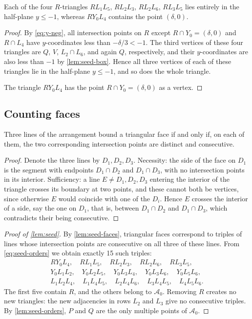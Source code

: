 \begin{lemma}\label{lem:r-triangles-below}
Each of the four $R$-triangles $RL_1L_5$, $RL_2L_3$, $RL_2L_6$, $RL_3L_5$ lies entirely in the half-plane $y\le-1$, whereas $RY_0L_4$ contains the point $(\delta,0)$.
\end{lemma}

\begin{proof}
By \eqref{eq:y-neg}, all intersection points on $R$ except $R\cap Y_0=(\delta,0)$ and $R\cap L_4$ have $y$-coordinates less than $-\delta/3<-1$.
The third vertices of these four triangles are $Q$, $V$,
$L_2\cap L_6$, and again $Q$, respectively, and their $y$-coordinates are also less than $-1$ by \cref{lem:seed-box}.
Hence all three vertices of each of these triangles lie in the half-plane $y\le-1$, and so does the
whole triangle.

The triangle $RY_0L_4$ has the point $R\cap Y_0=(\delta,0)$ as a vertex.
\end{proof}

\subsection{Counting faces}\label{app:seed-faces}

\begin{lemma}\label{lem:seed-faces}
Three lines of the arrangement bound a triangular face if and
only if, on each of them, the two corresponding intersection points
are distinct and consecutive.
\end{lemma}

\begin{proof}
Denote the three lines by $D_1,D_2,D_3$.
Necessity: the side of the face on $D_1$ is the segment with endpoints $D_1\cap D_2$ and $D_1\cap D_3$, with no intersection points in its interior.
Sufficiency: a line $E\neq D_1,D_2,D_3$ entering the interior of the triangle crosses its boundary at two points, and these cannot both be vertices, since otherwise $E$ would coincide with one of the $D_i$.
Hence $E$ crosses the interior of a side, say the one on $D_1$, that is, between $D_1\cap D_2$ and $D_1\cap D_3$, which contradicts their being consecutive.
\end{proof}

\begin{proof}[Proof of \cref{lem:seed}]
By \cref{lem:seed-faces}, triangular faces correspond to triples of lines whose intersection points are consecutive on all three of these lines.
From \eqref{eq:seed-orders} we obtain exactly 15 such triples:
\[
\begin{gathered}
RY_0L_4,\quad RL_1L_5,\quad RL_2L_3,\quad
RL_2L_6,\quad RL_3L_5,\\
Y_0L_1L_2,\quad Y_0L_2L_5,\quad Y_0L_3L_4,\quad
Y_0L_3L_6,\quad Y_0L_5L_6,\\
L_1L_2L_4,\quad L_1L_4L_5,\quad L_2L_4L_6,\quad
L_3L_4L_5,\quad L_4L_5L_6.
\end{gathered}
\]
The first five contain $R$, and the others belong to $\mathcal A_0$.
Removing $R$ creates no new triangles: the new adjacencies in rows $L_2$ and $L_3$ give no consecutive triples.
By \cref{lem:seed-orders}, $P$ and $Q$ are the only multiple points of $\mathcal A_0$.
\end{proof}

